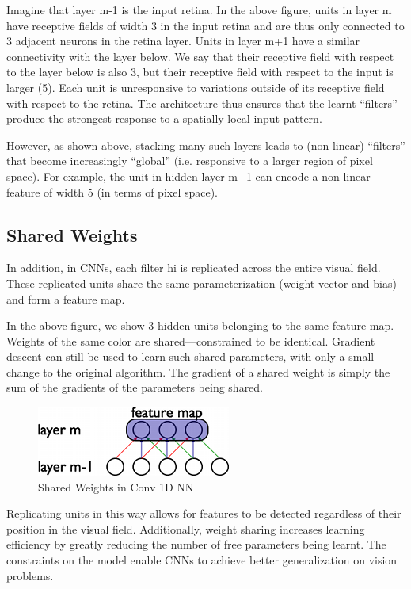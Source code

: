\documentclass{article}
\begin{document}
Imagine that layer m-1 is the input retina. In the above figure, units in layer m have receptive fields of width 3 in the input retina and are thus only connected to 3 adjacent neurons in the retina layer. Units in layer m+1 have a similar connectivity with the layer below. We say that their receptive field with respect to the layer below is also 3, but their receptive field with respect to the input is larger (5). Each unit is unresponsive to variations outside of its receptive field with respect to the retina. The architecture thus ensures that the learnt “filters” produce the strongest response to a spatially local input pattern.

However, as shown above, stacking many such layers leads to (non-linear) “filters” that become increasingly “global” (i.e. responsive to a larger region of pixel space). For example, the unit in hidden layer m+1 can encode a non-linear feature of width 5 (in terms of pixel space).

\subsection{Shared Weights}

\quad In addition, in CNNs, each filter hi is replicated across the entire visual field. These replicated units share the same parameterization (weight vector and bias) and form a feature map.



In the above figure, we show 3 hidden units belonging to the same feature map. Weights of the same color are shared—constrained to be identical. Gradient descent can still be used to learn such shared parameters, with only a small change to the original algorithm. The gradient of a shared weight is simply the sum of the gradients of the parameters being shared.

\begin{figure}[H]
\centering
\includegraphics[width=.2\textwidth]{conv_1D_nn.png}
\caption{Shared Weights in Conv 1D NN}
\end{figure}

Replicating units in this way allows for features to be detected regardless of their position in the visual field. Additionally, weight sharing increases learning efficiency by greatly reducing the number of free parameters being learnt. The constraints on the model enable CNNs to achieve better generalization on vision problems.
\end{document}
